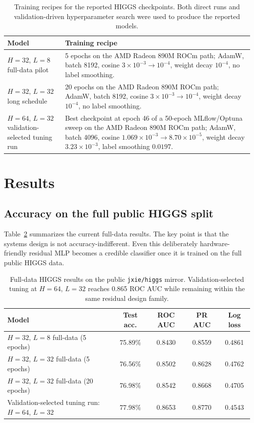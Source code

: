 \documentclass[a4paper,11pt]{article}
\newcommand{\code}[1]{\texttt{#1}}
\begin{document}
\begin{table}[t]
\centering
\footnotesize
\begin{tabularx}{\textwidth}{@{}lX@{}}
\toprule
Model & Training recipe \\
\midrule
$H=32$, $L=8$ full-data pilot &
5 epochs on the AMD Radeon 890M ROCm path; AdamW, batch 8192, cosine
$3\times10^{-3} \rightarrow 10^{-4}$, weight decay $10^{-4}$, no label smoothing. \\
$H=32$, $L=32$ long schedule &
20 epochs on the AMD Radeon 890M ROCm path; AdamW, batch 8192, cosine
$3\times10^{-3} \rightarrow 10^{-4}$, weight decay $10^{-4}$, no label smoothing. \\
$H=64$, $L=32$ validation-selected tuning run &
Best checkpoint at epoch 46 of a 50-epoch MLflow/Optuna sweep on the AMD
Radeon 890M ROCm path; AdamW, batch 4096, cosine
$1.069\times10^{-3} \rightarrow 8.70\times10^{-5}$, weight decay
$3.23\times10^{-3}$, label smoothing $0.0197$. \\
\bottomrule
\end{tabularx}
\caption{Training recipes for the reported HIGGS checkpoints. Both direct runs
and validation-driven hyperparameter search were used to produce the reported
models.}
\label{tab:training-protocol}
\end{table}

\section{Results}

\subsection{Accuracy on the full public HIGGS split}

Table~\ref{tab:higgs-full-results} summarizes the current full-data results.
The key point is that the systems design is not accuracy-indifferent. Even this
deliberately hardware-friendly residual MLP becomes a credible classifier once
it is trained on the full public HIGGS data.

\begin{table}[t]
\centering
\footnotesize
\begin{tabular}{@{}lcccc@{}}
\toprule
Model & Test acc. & ROC AUC & PR AUC & Log loss \\
\midrule
$H=32$, $L=8$ full-data (5 epochs) & 75.89\% & 0.8430 & 0.8559 & 0.4861 \\
$H=32$, $L=32$ full-data (5 epochs) & 76.56\% & 0.8502 & 0.8628 & 0.4762 \\
$H=32$, $L=32$ full-data (20 epochs) & 76.98\% & 0.8542 & 0.8668 & 0.4705 \\
Validation-selected tuning run: $H=64$, $L=32$ & 77.98\% & 0.8653 & 0.8770 & 0.4543 \\
\bottomrule
\end{tabular}
\caption{Full-data HIGGS results on the public \code{jxie/higgs} mirror.
Validation-selected tuning at $H=64$, $L=32$ reaches 0.865 ROC AUC while
remaining within the same residual design family.}
\label{tab:higgs-full-results}
\end{table}
\end{document}
